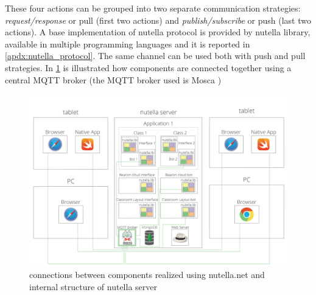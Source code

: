 These four actions can be grouped into two separate communication strategies: \textit{request/response} or pull (first two actions) and \textit{publish/subscribe} or push (last two actions). A base implementation of nutella protocol is provided by nutella library, available in multiple programming languages \cite{nutella_framework} and it is reported in \autoref{apdx:nutella_protocol}. The same channel can be used both with push and pull strategies. In \ref{fig:nutella_overview} is illustrated how components are connected together using a central MQTT broker (the MQTT broker used is Mosca \cite{Mosca})

\begin{figure}
\centering
\includegraphics[width=6in]{images/nutella-client-server-broker.png}
\caption{connections between components realized using nutella.net and internal structure of nutella server}
\label{fig:nutella_overview}
\end{figure}

